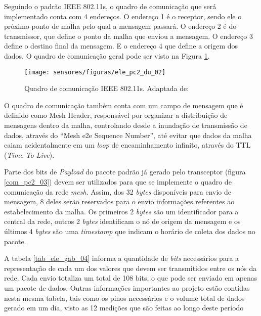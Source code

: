 Seguindo o padrão IEEE 802.11s, o quadro de comunicação que será implementado conta com 4 endereços. O endereço 1 é o receptor, sendo ele o próximo ponto de malha pelo qual a mensagem passará. O endereço 2 é do transmissor, que define o ponto da malha que enviou a mensagem. O endereço 3 define o destino final da mensagem. E o endereço 4 que define a origem dos dados. O quadro de comunicação geral pode ser visto na Figura \ref{ele_pc2_du_02}.

\begin{figure}[H]
\centering
\texttt{[image: sensores/figuras/ele\_pc2\_du\_02]}
\caption{Quadro de comunicação IEEE 802.11s. Adaptada de:\cite{bib_ele_du_2}}
\label{ele_pc2_du_02}
\end{figure}

O quadro de comunicação também conta com um campo de mensagem que é definido como Mesh Header, responsável por organizar a distribuição de mensagens dentro da malha, controlando desde a inundação de transmissão de dados, através do ``Mesh e2e Sequence Number'', até evitar que dados da malha caiam acidentalmente em um \emph{loop} de encaminhamento infinito, através do TTL (\emph{Time To Live}).

Parte dos bits de \emph{Payload} do pacote padrão já gerado pelo transceptor (figura \ref{com_pc2_03}) devem ser utilizados para que se implemente o quadro de comunicação da rede \emph{mesh}. Assim, dos 32 \emph{bytes} disponíveis para envio de mensagem, 8 deles serão reservados para o envio informações referentes ao estabelecimento da malha. Os primeiros 2 \emph{bytes} são um identificador para a central da rede, outros 2 \emph{bytes} identificam o nó de origem da mensagem e os últimos 4 \emph{bytes} são uma \emph{timestamp} que indicam o horário de coleta dos dados no pacote.

A tabela \ref{tab_ele_gab_04} informa a quantidade de \emph{bits} necessários para a representação de cada um dos valores que devem ser transmitidos entre os nós da rede. Cada envio totaliza um total de 108 bits, o que pode ser enviado em apenas um pacote de dados. Outras informações importantes ao projeto estão contidas nesta mesma tabela, tais como os pinos necessários e o volume total de dados gerado em um dia, visto as 12 medições que são feitas ao longo deste período   

